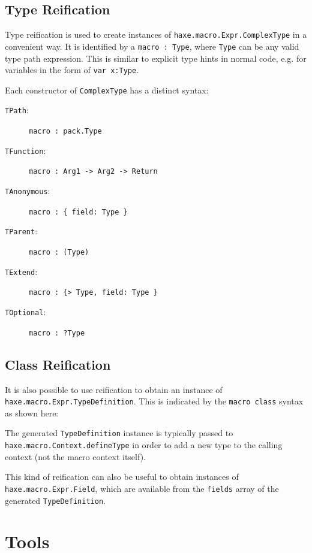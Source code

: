 \documentclass[a4paper,oneside]{book}
\newcommand{\type}[1]{\texttt{#1}}
\newcommand{\expr}[1]{\texttt{#1}}
\newcommand{\haxe}[2][]{%
}
\begin{document}
\subsection{Type Reification}
\label{macro-reification-type}

Type reification is used to create instances of \type{haxe.macro.Expr.ComplexType} in a convenient way. It is identified by a \expr{macro : Type}, where \expr{Type} can be any valid type path expression. This is similar to explicit type hints in normal code, e.g. for variables in the form of \expr{var x:Type}.

Each constructor of \type{ComplexType} has a distinct syntax:

\begin{description}
	\item[\expr{TPath}:] \expr{macro : pack.Type}
	\item[\expr{TFunction}:] \expr{macro : Arg1 -> Arg2 -> Return}
	\item[\expr{TAnonymous}:] \expr{macro : \{ field: Type \}}
	\item[\expr{TParent}:] \expr{macro : (Type)}
	\item[\expr{TExtend}:] \expr{macro : \{> Type, field: Type \}}
	\item[\expr{TOptional}:] \expr{macro : ?Type}
\end{description}

\subsection{Class Reification}
\label{macro-reification-class}

It is also possible to use reification to obtain an instance of \type{haxe.macro.Expr.TypeDefinition}. This is indicated by the \expr{macro class} syntax as shown here:

\haxe{assets/ClassReification.hx}

The generated \type{TypeDefinition} instance is typically passed to \expr{haxe.macro.Context.defineType} in order to add a new type to the calling context (not the macro context itself).

This kind of reification can also be useful to obtain instances of \expr{haxe.macro.Expr.Field}, which are available from the \expr{fields} array of the generated \type{TypeDefinition}. 

\section{Tools}
\label{macro-tools}
\end{document}
